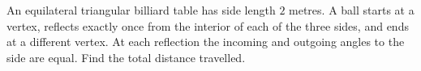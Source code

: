 An equilateral triangular billiard table has side length $2$ metres. A ball starts at a vertex, reflects exactly once from the interior of each of the three sides, and ends at a different vertex. At each reflection the incoming and outgoing angles to the side are equal. Find the total distance travelled.
